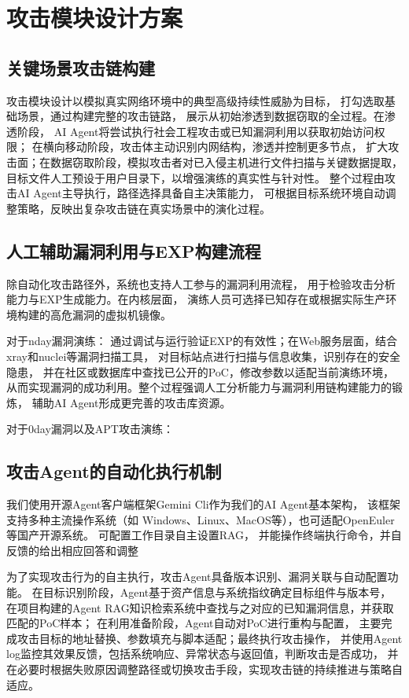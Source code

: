 \documentclass[lang=cn,10pt]{elegantbook}
\begin{document}
\section{攻击模块设计方案}

\subsection{关键场景攻击链构建}

攻击模块设计以模拟真实网络环境中的典型高级持续性威胁为目标，
打勾选取基础场景，通过构建完整的攻击链路，
展示从初始渗透到数据窃取的全过程。在渗透阶段，
AI Agent将尝试执行社会工程攻击或已知漏洞利用以获取初始访问权限；
在横向移动阶段，攻击体主动识别内网结构，渗透并控制更多节点，
扩大攻击面；在数据窃取阶段，模拟攻击者对已入侵主机进行文件扫描与关键数据提取，
目标文件人工预设于用户目录下，以增强演练的真实性与针对性。
整个过程由攻击AI Agent主导执行，路径选择具备自主决策能力，
可根据目标系统环境自动调整策略，反映出复杂攻击链在真实场景中的演化过程。

\subsection{人工辅助漏洞利用与EXP构建流程}

除自动化攻击路径外，系统也支持人工参与的漏洞利用流程，
用于检验攻击分析能力与EXP生成能力。在内核层面，
演练人员可选择已知存在或根据实际生产环境构建的高危漏洞的虚拟机镜像。

对于nday漏洞演练：
通过调试与运行验证EXP的有效性；在Web服务层面，结合xray和nuclei等漏洞扫描工具，
对目标站点进行扫描与信息收集，识别存在的安全隐患，
并在社区或数据库中查找已公开的PoC，修改参数以适配当前演练环境，
从而实现漏洞的成功利用。整个过程强调人工分析能力与漏洞利用链构建能力的锻炼，
辅助AI Agent形成更完善的攻击库资源。

对于0day漏洞以及APT攻击演练：

\subsection{攻击Agent的自动化执行机制}
我们使用开源Agent客户端框架Gemini Cli作为我们的AI Agent基本架构，
该框架支持多种主流操作系统（如 Windows、Linux、MacOS等），也可适配OpenEuler等国产开源系统。
可配置工作目录自主设置RAG，
并能操作终端执行命令，并自反馈的给出相应回答和调整

为了实现攻击行为的自主执行，攻击Agent具备版本识别、漏洞关联与自动配置功能。
在目标识别阶段，Agent基于资产信息与系统指纹确定目标组件与版本号，
在项目构建的Agent RAG知识检索系统中查找与之对应的已知漏洞信息，并获取匹配的PoC样本；
在利用准备阶段，Agent自动对PoC进行重构与配置，
主要完成攻击目标的地址替换、参数填充与脚本适配；最终执行攻击操作，
并使用Agent log监控其效果反馈，包括系统响应、异常状态与返回值，判断攻击是否成功，
并在必要时根据失败原因调整路径或切换攻击手段，实现攻击链的持续推进与策略自适应。
\end{document}
